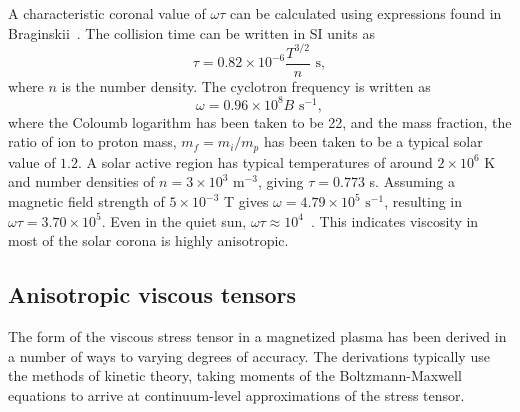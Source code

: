 A characteristic coronal value of $\omega \tau$ can be calculated using expressions found in Braginskii~\cite{braginskiiTransportProcessesPlasma1965}. The collision time can be written in SI units as
\begin{equation}
  \label{eq:collision_time}
  \tau = 0.82 \times 10^{-6} \frac{T^{3/2}}{n} \text{ s},
\end{equation}
where $n$ is the number density. The cyclotron frequency is written as
\begin{equation}
  \label{eq:cyclotron_frequency}
  \omega = 0.96\times10^8 B \text{ s}^{-1},
\end{equation}
where the Coloumb logarithm has been taken to be 22, and the mass fraction, the ratio of ion to proton mass, $m_f = m_i/m_p$ has been taken to be a typical solar value of $1.2$. A solar active region has typical temperatures of around $2\times 10^6$ K and number densities of $n = 3 \times 10^3\text{ m}^{-3}$, giving $\tau = 0.773$ s. Assuming a magnetic field strength of $5\times 10^{-3}$ T gives $\omega = 4.79 \times 10^5 \text{ s}^{-1}$, resulting in $\omega \tau = 3.70 \times 10^5$. Even in the quiet sun, $\omega\tau \approx 10^4$~\cite{morganGlobalConditionsSolar2017}. This indicates viscosity in most of the solar corona is highly anisotropic. 

\subsection{Anisotropic viscous tensors}

The form of the viscous stress tensor in a magnetized plasma has been derived in a number of ways to varying degrees of accuracy. The derivations typically use the methods of kinetic theory, taking moments of the Boltzmann-Maxwell equations to arrive at continuum-level approximations of the stress tensor.

